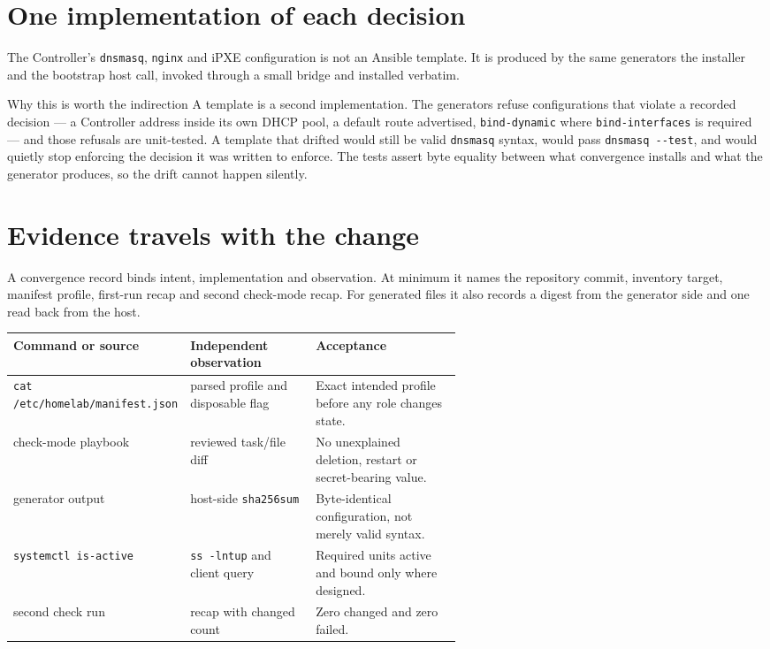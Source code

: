 \section{One implementation of each decision}
The Controller's \texttt{dnsmasq}, \texttt{nginx} and iPXE configuration is not
an Ansible template. It is produced by the same generators the installer and the
bootstrap host call, invoked through a small bridge and installed verbatim.

\begin{telospanel}{Why this is worth the indirection}
A template is a second implementation. The generators refuse configurations that
violate a recorded decision --- a Controller address inside its own DHCP pool, a
default route advertised, \texttt{bind-dynamic} where \texttt{bind-interfaces} is
required --- and those refusals are unit-tested. A template that drifted would
still be valid \texttt{dnsmasq} syntax, would pass \texttt{dnsmasq -{}-test}, and
would quietly stop enforcing the decision it was written to enforce. The tests
assert byte equality between what convergence installs and what the generator
produces, so the drift cannot happen silently.
\end{telospanel}

\section{Evidence travels with the change}
A convergence record binds intent, implementation and observation. At minimum
it names the repository commit, inventory target, manifest profile, first-run
recap and second check-mode recap. For generated files it also records a digest
from the generator side and one read back from the host.

\begin{tabularx}{\linewidth}{@{}p{0.30\linewidth}p{0.29\linewidth}L@{}}
\toprule
\textbf{Command or source} & \textbf{Independent observation} &
\textbf{Acceptance}\\
\midrule
\texttt{cat /etc/homelab/manifest.json} & parsed profile and disposable flag &
Exact intended profile before any role changes state.\\
check-mode playbook & reviewed task/file diff &
No unexplained deletion, restart or secret-bearing value.\\
generator output & host-side \texttt{sha256sum} & Byte-identical configuration,
not merely valid syntax.\\
\texttt{systemctl is-active} & \texttt{ss -lntup} and client query & Required
units active and bound only where designed.\\
second check run & recap with changed count & Zero changed and zero failed.\\
\bottomrule
\end{tabularx}


